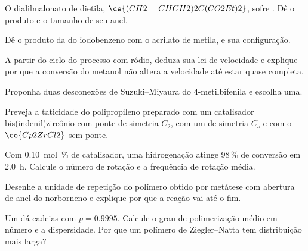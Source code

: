 \begin{exercise}[$\star$]\label{exo:b3:homogeneous-catalysis:3}
O dialilmalonato de dietila, $\ce{(CH2=CHCH2)2C(CO2Et)2}$, sofre .
Dê o produto e o tamanho de seu anel.
\end{exercise}

\begin{exercise}[$\star$]\label{exo:b3:homogeneous-catalysis:4}
Dê o produto da  do iodobenzeno com o acrilato de metila, e sua
configuração.
\end{exercise}

\begin{exercise}[$\star\star$]\label{exo:b3:homogeneous-catalysis:5}
A partir do ciclo do processo com ródio, deduza sua lei de velocidade e explique
por que a conversão do metanol não altera a velocidade até estar quase completa.
\end{exercise}

\begin{exercise}[$\star\star$]\label{exo:b3:homogeneous-catalysis:6}
Proponha duas desconexões de Suzuki--Miyaura do 4-metilbifenila e escolha uma.
\end{exercise}

\begin{exercise}[$\star\star$]\label{exo:b3:homogeneous-catalysis:7}
Preveja a taticidade do polipropileno preparado com um catalisador bis(indenil)zircônio
com ponte de simetria $C_2$, com um de simetria $C_s$ e com o $\ce{Cp2ZrCl2}$ sem ponte.
\end{exercise}

\begin{exercise}[$\star\star$]\label{exo:b3:homogeneous-catalysis:8}
Com \qty{0.10}{mol\%} de catalisador, uma hidrogenação atinge 98\,\% de conversão em \qty{2.0}{h}.
Calcule o número de rotação e a frequência de rotação média.
\end{exercise}

\begin{exercise}[$\star\star$]\label{exo:b3:homogeneous-catalysis:9}
Desenhe a unidade de repetição do polímero obtido por metátese com abertura de anel do
norborneno e explique por que a reação vai até o fim.
\end{exercise}

\begin{exercise}[$\star\star\star$]\label{exo:b3:homogeneous-catalysis:10}
Um  dá cadeias com $p = 0.9995$. Calcule o grau de
polimerização médio em número e a dispersidade. Por que um polímero de Ziegler--Natta tem
distribuição mais larga?
\end{exercise}


